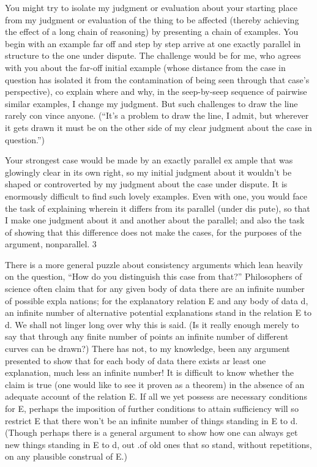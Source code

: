 \documentclass[11pt,openany]{book}
\begin{document}
You might try to isolate my judgment or evaluation about your starting place from my judgment or evaluation of the thing to be affected (thereby achieving the effect of a long chain of reasoning) by presenting a chain of examples. You begin with an example far off and step by step arrive at one exactly parallel in structure to the one under dispute. The challenge would be for me, who agrees with you about the far-off initial example (whose distance from the case in question has isolated it from the contamination of being seen through that case's perspective), co explain where and why, in the seep-by-seep sequence of pairwise similar examples, I change my judgment. But such challenges to draw the line rarely con vince anyone. (``It's a problem to draw the line, I admit, but wherever it gets drawn it must be on the other side of my clear judgment about the case in question.'') 

Your strongest case would be made by an exactly parallel ex ample that was glowingly clear in its own right, so my initial judgment about it wouldn't be shaped or controverted by my judgment about the case under dispute. It is enormously difficult to find such lovely examples. Even with one, you would face the task of explaining wherein it differs from its parallel (under dis pute), so that I make one judgment about it and another about the parallel; and also the task of showing that this difference does not make the cases, for the purposes of the argument, nonparallel. 3 

There is a more general puzzle about consistency arguments which lean heavily on the question, ``How do you distinguish this case from that?'' Philosophers of science often claim that for any given body of data there are an infinite number of possible expla nations; for the explanatory relation E and any body of data d, an infinite number of alternative potential explanations stand in the relation E to d. We shall not linger long over why this is said. (Is it really enough merely to say that through any finite number of points an infinite number of different curves can be drawn?) There has not, to my knowledge, been any argument presented to show that for each body of data there exists ar least one explanation, much less an infinite number! It is difficult to know whether the claim is true (one would like to see it proven as a theorem) in the absence of an adequate account of the relation E. If all we yet possess are necessary conditions for E, perhaps the imposition of further conditions to attain sufficiency will so restrict E that there won't be an infinite number of things standing in E to d. (Though perhaps there is a general argument to show how one can always get new things standing in E to d, out .of old ones that so stand, without repetitions, on any plausible construal of E.) 
\end{document}
